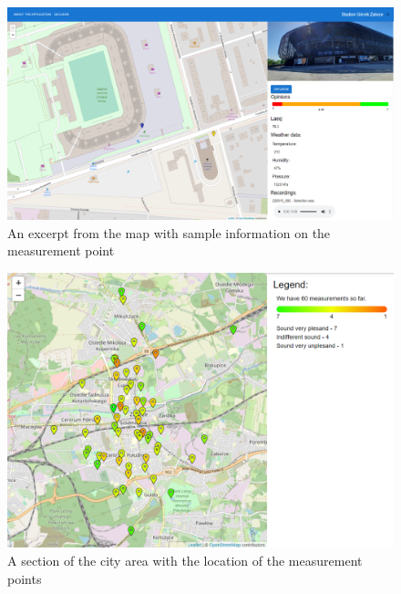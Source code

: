 \documentclass[a4paper,10pt]{article}
\begin{document}
\begin{figure}[H]
  \includegraphics[scale=.9]{fig4.png}
  \centering
  \caption{An excerpt from the map with sample information on the measurement point}
  \label{finalUI}
\end{figure}

\begin{figure}[H]
  \includegraphics[scale=.5]{fig5.png}
  \centering
  \caption{A section of the city area with the location of the measurement points}
  \label{finalMap}
\end{figure}
\end{document}
